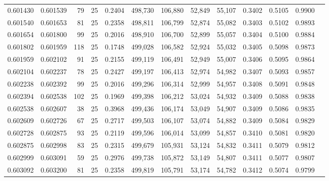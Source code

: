 \begin{tabular}{rrrrrrrrrrrrr}
0.601430 & 0.601539 &    79 &  25 &                                     0.2404 & 498,730 & 106,880 &  52,849 &  55,107 & 0.3402 & 0.5105 & 0.9900 \\
0.601540 & 0.601653 &    81 &  25 &                                     0.2358 & 498,811 & 106,799 &  52,874 &  55,082 & 0.3403 & 0.5102 & 0.9893 \\
0.601654 & 0.601800 &    99 &  25 &                                     0.2016 & 498,910 & 106,700 &  52,899 &  55,057 & 0.3404 & 0.5100 & 0.9884 \\
0.601802 & 0.601959 &   118 &  25 &                                     0.1748 & 499,028 & 106,582 &  52,924 &  55,032 & 0.3405 & 0.5098 & 0.9873 \\
0.601959 & 0.602102 &    91 &  25 &                                     0.2155 & 499,119 & 106,491 &  52,949 &  55,007 & 0.3406 & 0.5095 & 0.9864 \\
0.602104 & 0.602237 &    78 &  25 &                                     0.2427 & 499,197 & 106,413 &  52,974 &  54,982 & 0.3407 & 0.5093 & 0.9857 \\
0.602238 & 0.602392 &    99 &  25 &                                     0.2016 & 499,296 & 106,314 &  52,999 &  54,957 & 0.3408 & 0.5091 & 0.9848 \\
0.602394 & 0.602538 &   102 &  25 &                                     0.1969 & 499,398 & 106,212 &  53,024 &  54,932 & 0.3409 & 0.5088 & 0.9838 \\
0.602538 & 0.602607 &    38 &  25 &                                     0.3968 & 499,436 & 106,174 &  53,049 &  54,907 & 0.3409 & 0.5086 & 0.9835 \\
0.602609 & 0.602726 &    67 &  25 &                                     0.2717 & 499,503 & 106,107 &  53,074 &  54,882 & 0.3409 & 0.5084 & 0.9829 \\
0.602728 & 0.602875 &    93 &  25 &                                     0.2119 & 499,596 & 106,014 &  53,099 &  54,857 & 0.3410 & 0.5081 & 0.9820 \\
0.602875 & 0.602998 &    83 &  25 &                                     0.2315 & 499,679 & 105,931 &  53,124 &  54,832 & 0.3411 & 0.5079 & 0.9812 \\
0.602999 & 0.603091 &    59 &  25 &                                     0.2976 & 499,738 & 105,872 &  53,149 &  54,807 & 0.3411 & 0.5077 & 0.9807 \\
0.603092 & 0.603200 &    81 &  25 &                                     0.2358 & 499,819 & 105,791 &  53,174 &  54,782 & 0.3412 & 0.5074 & 0.9799 \\

\end{tabular}
